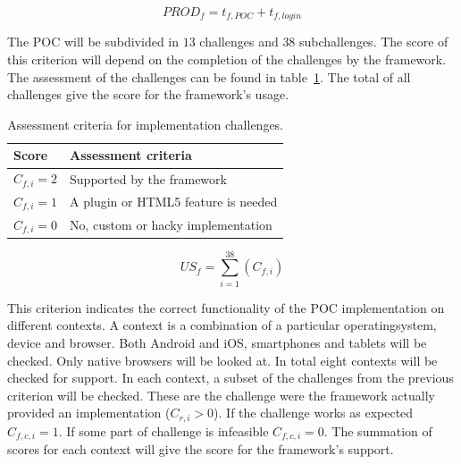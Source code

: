 \documentclass[a4paper]{artikel3}
\newcommand{\setspace}[0]{\vspace{2mm}}
\renewcommand{\paragraph}[1]{\setspace \noindent {\bf #1}  }
\begin{document}
\begin{equation}
  PROD_f = {t_{f,POC} + t_{f,login}}
  \label{eq:productiviteit}
\end{equation}

\paragraph{Usage}
The POC will be subdivided in $13$ challenges and $38$ subchallenges.  
The score of this criterion will depend on the completion of the challenges by the framework.  
The assessment of the challenges can be found in table~\ref{table:challenges-scores}.  
The total of all challenges give the score for the framework's usage.

\begin{table}[h]	
\centering
\begin{tabular}{ll}
\toprule
\textbf{Score} & \textbf{Assessment criteria}\\
\midrule
$C_{f,i} = 2$ & Supported by the framework\\
$C_{f,i} = 1$ & A plugin or HTML5 feature is needed\\
$C_{f,i} = 0$ & No, custom or hacky implementation\\
\bottomrule
\end{tabular}
\caption{Assessment criteria for implementation challenges.}
\label{table:challenges-scores}
\end{table}

\begin{equation}
  US_f = \sum_{i=1}^{38}{\left(C_{f,i}\right)}
  \label{eq:gebruik}
\end{equation}

\paragraph{Support}
This criterion indicates the correct functionality of the POC implementation on different contexts.
A context is a combination of a particular operatingsystem, device and browser.
Both Android and iOS, smartphones and tablets will be checked.
Only native browsers will be looked at.
In total eight contexts will be checked for support.
In each context,  a subset of the challenges from the previous criterion will be checked.  
These are the challenge were the framework actually provided an implementation ($C_{r,i} > 0$).
If the challenge works as expected $C_{f,c,i} = 1$.
If some part of challenge is infeasible $C_{f,c,i} = 0$.
The summation of scores for each context will give the score for the framework's support.
\end{document}
